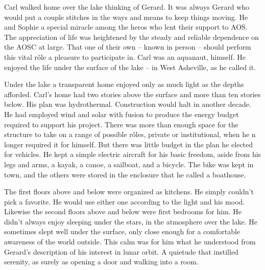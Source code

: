 Carl walked home over the lake thinking of Gerard.  It was always
Gerard who would put a couple stitches in the ways and means to keep
things moving.  He and Sophie a special miracle among the heros who
lent their support to AOS.  The appreciation of life was heightened by
the steady and reliable dependence on the AOSC at large.  That one of
their own -- known in person -- should perform this vital r\^ole a
pleasure to participate in.  Carl was an aquanaut, himself.  He
enjoyed the life under the surface of the lake -- in West Asheville,
as he called it.



Under the lake a transparent home enjoyed only as much light as the
depths afforded.  Carl's home had two stories above the surface and
more than ten stories below.  His plan was hydrothermal.  Construction
would halt in another decade.  He had employed wind and solar with
fusion to produce the energy budget required to support his project.
There was more than enough space for the structure to take on a range
of possible r\^oles, private or institutional, when he n longer
required it for himself.  But there was little budget in the plan he
elected for vehicles.  He kept a simple electric aircraft for his
basic freedom, aside from his legs and arms, a kayak, a canoe, a
sailboat, and a bicycle.  The bike was kept in town, and the others
were stored in the enclosure that he called a boathouse.

The first floors above and below were organized as kitchens.  He
simply couldn't pick a favorite.  He would use either one according to
the light and his mood.  Likewise the second floors above and below
were first bedrooms for him.  He didn't always enjoy sleeping under
the stars, in the atmosphere over the lake.  He sometimes slept well
under the surface, only close enough for a comfortable awareness of
the world outside.  This calm was for him what he understood from
Gerard's description of his interest in lunar orbit.  A quietude that
instilled serenity, as surely as opening a door and walking into a
room.




